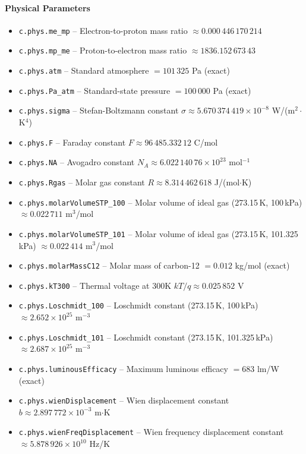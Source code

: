 \paragraph{Physical Parameters}
\begin{itemize}
\item \texttt{c.phys.me\_mp} -- Electron-to-proton mass ratio $\approx 0.000\,446\,170\,214$
\item \texttt{c.phys.mp\_me} -- Proton-to-electron mass ratio $\approx 1836.152\,673\,43$
\item \texttt{c.phys.atm} -- Standard atmosphere $= 101\,325$ Pa (exact)
\item \texttt{c.phys.Pa\_atm} -- Standard-state pressure $= 100\,000$ Pa (exact)
\item \texttt{c.phys.sigma} -- Stefan-Boltzmann constant $\sigma \approx 5.670\,374\,419 \times 10^{-8}$ W/(m$^2 \cdot$ K$^4$)
\item \texttt{c.phys.F} -- Faraday constant $F \approx 96\,485.332\,12$ C/mol
\item \texttt{c.phys.NA} -- Avogadro constant $N_A \approx 6.022\,140\,76 \times 10^{23}$ mol$^{-1}$
\item \texttt{c.phys.Rgas} -- Molar gas constant $R \approx 8.314\,462\,618$ J/(mol$\cdot$K)
\item \texttt{c.phys.molarVolumeSTP\_100} -- Molar volume of ideal gas (273.15\,K, 100\,kPa) $\approx 0.022\,711$ m$^3$/mol
\item \texttt{c.phys.molarVolumeSTP\_101} -- Molar volume of ideal gas (273.15\,K, 101.325\,kPa) $\approx 0.022\,414$ m$^3$/mol
\item \texttt{c.phys.molarMassC12} -- Molar mass of carbon-12 $= 0.012$ kg/mol (exact)
\item \texttt{c.phys.kT300} -- Thermal voltage at 300K $kT/q \approx 0.025\,852$ V
\item \texttt{c.phys.Loschmidt\_100} -- Loschmidt constant (273.15\,K, 100\,kPa) $\approx 2.652 \times 10^{25}$ m$^{-3}$
\item \texttt{c.phys.Loschmidt\_101} -- Loschmidt constant (273.15\,K, 101.325\,kPa) $\approx 2.687 \times 10^{25}$ m$^{-3}$
\item \texttt{c.phys.luminousEfficacy} -- Maximum luminous efficacy $= 683$ lm/W (exact)
\item \texttt{c.phys.wienDisplacement} -- Wien displacement constant $b \approx 2.897\,772 \times 10^{-3}$ m$\cdot$K
\item \texttt{c.phys.wienFreqDisplacement} -- Wien frequency displacement constant $\approx 5.878\,926 \times 10^{10}$ Hz/K

\end{itemize}
